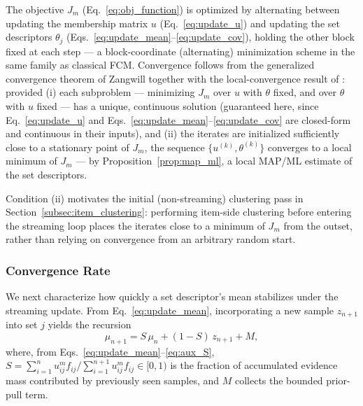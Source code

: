 \documentclass{article}
\theoremstyle{plain}
\theoremstyle{definition}
\theoremstyle{remark}
\begin{document}
The objective $J_m$ (Eq.~\eqref{eq:obj_function}) is optimized by alternating between updating the membership matrix $u$ (Eq.~\eqref{eq:update_u}) and updating the set descriptors $\theta_j$ (Eqs.~\eqref{eq:update_mean}--\eqref{eq:update_cov}), holding the other block fixed at each step — a block-coordinate (alternating) minimization scheme in the same family as classical FCM. Convergence follows from the generalized convergence theorem of Zangwill together with the local-convergence result of \cite{hathaway1986local}: provided (i) each subproblem — minimizing $J_m$ over $u$ with $\theta$ fixed, and over $\theta$ with $u$ fixed — has a unique, continuous solution (guaranteed here, since Eq.~\eqref{eq:update_u} and Eqs.~\eqref{eq:update_mean}--\eqref{eq:update_cov} are closed-form and continuous in their inputs), and (ii) the iterates are initialized sufficiently close to a stationary point of $J_m$, the sequence $\{u^{(k)}, \theta^{(k)}\}$ converges to a local minimum of $J_m$ — by Proposition~\ref{prop:map_ml}, a local MAP/ML estimate of the set descriptors.

Condition (ii) motivates the initial (non-streaming) clustering pass in Section~\ref{subsec:item_clustering}: performing item-side clustering before entering the streaming loop places the iterates close to a minimum of $J_m$ from the outset, rather than relying on convergence from an arbitrary random start.

\subsubsection{Convergence Rate}

We next characterize how quickly a set descriptor's mean stabilizes under the streaming update. From Eq.~\eqref{eq:update_mean}, incorporating a new sample $z_{n+1}$ into set $j$ yields the recursion
\begin{equation}
	\label{eq:mu_recursion}
	\mu_{n+1} = S \, \mu_n + (1-S) \, z_{n+1} + M,
\end{equation}
where, from Eqs.~\eqref{eq:update_mean}--\eqref{eq:aux_S}, $S = \sum_{i=1}^{n} u_{ij}^m f_{ij} \big/ \sum_{i=1}^{n+1} u_{ij}^m f_{ij} \in [0,1)$ is the fraction of accumulated evidence mass contributed by previously seen samples, and $M$ collects the bounded prior-pull term.
\end{document}

